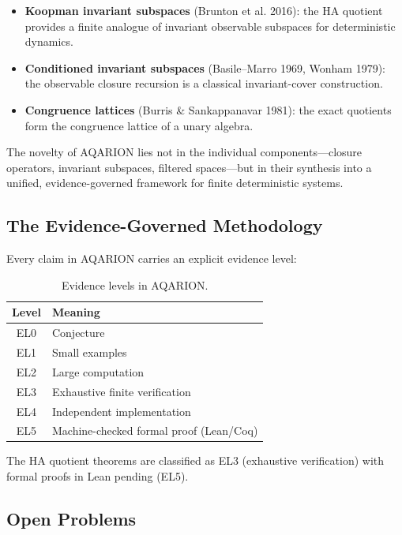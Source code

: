 \documentclass[11pt, a4paper]{article}
\theoremstyle{definition}
\theoremstyle{remark}
\begin{document}
\begin{itemize}
\item \textbf{Koopman invariant subspaces} (Brunton et al. 2016): the HA quotient provides a finite analogue of invariant observable subspaces for deterministic dynamics.
\item \textbf{Conditioned invariant subspaces} (Basile–Marro 1969, Wonham 1979): the observable closure recursion is a classical invariant-cover construction.
\item \textbf{Congruence lattices} (Burris \& Sankappanavar 1981): the exact quotients form the congruence lattice of a unary algebra.
\end{itemize}

The novelty of AQARION lies not in the individual components—closure operators, invariant subspaces, filtered spaces—but in their synthesis into a unified, evidence-governed framework for finite deterministic systems.

\subsection{The Evidence-Governed Methodology}

Every claim in AQARION carries an explicit evidence level:

\begin{table}[h]
\centering
\begin{tabular}{c|l}
\toprule
\textbf{Level} & \textbf{Meaning} \\
\midrule
EL0 & Conjecture \\
EL1 & Small examples \\
EL2 & Large computation \\
EL3 & Exhaustive finite verification \\
EL4 & Independent implementation \\
EL5 & Machine-checked formal proof (Lean/Coq) \\
\bottomrule
\end{tabular}
\caption{Evidence levels in AQARION.}
\end{table}

The HA quotient theorems are classified as EL3 (exhaustive verification) with formal proofs in Lean pending (EL5).

\subsection{Open Problems}
\end{document}
